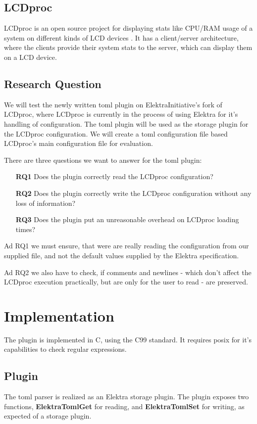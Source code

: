 \documentclass[12pt]{report}
\begin{document}
\section{LCDproc}
LCDproc is an open source project for displaying stats like CPU/RAM usage of a system on different kinds of LCD devices \cite{LCDprocmain}\cite{LCDprocgit}.
It has a client/server architecture, where the clients provide their system stats to the server, which can display them on a LCD device.

\section{Research Question}
We will test the newly written toml plugin on ElektraInitiative's fork of LCDproc, where LCDproc is currently in the process of using Elektra for it's handling of configuration.
The toml plugin will be used as the storage plugin for the LCDproc configuration.
We will create a \acrshort{toml} configuration file based LCDproc's main configuration file for evaluation.

There are three questions we want to answer for the toml plugin:
\begin{itemize}
	\item[\textbf{RQ1}] Does the plugin correctly read the LCDproc configuration?
	\item[\textbf{RQ2}] Does the plugin correctly write the LCDproc configuration without any loss of information?
	\item[\textbf{RQ3}] Does the plugin put an unreasonable overhead on LCDproc loading times?
\end{itemize}
Ad RQ1 we must ensure, that were are really reading the configuration from our supplied file, and not the default values supplied by the Elektra specification.

Ad RQ2 we also have to check, if comments and newlines - which don't affect the LCDproc execution practically, but are only for the user to read - are preserved.

\chapter{Implementation}

The plugin is implemented in C, using the C99 standard. It requires \acrshort{posix} for it's capabilities to check regular expressions.

\section{Plugin}
The toml parser is realized as an Elektra storage plugin. The plugin exposes two functions, \textbf{ElektraTomlGet} for reading, and \textbf{ElektraTomlSet} for writing, as expected of a storage plugin.
\end{document}
